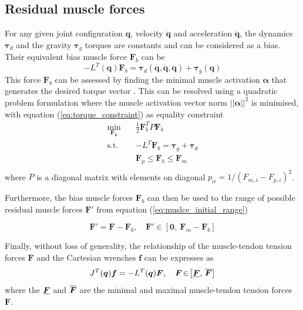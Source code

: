 \subsection{Residual muscle forces}
For any given joint configuration $\bm{q}$, velocity $\dot{\bm{q}}$ and acceleration $\ddot{\bm{q}}$, the dynamics $\bm{\tau}_d$ and the gravity $\bm{\tau}_g$ torques are constants and can be considered as a bias. Their equivalent bias muscle force $\bm{F}_{b}$ can be 
\begin{equation}
    -L^{T}(\bm{q})\bm{F}_{b} = \bm{\tau}_d(\bm{q},\dot{\bm{q}},\ddot{\bm{q}}) + \bm{\tau}_g(\bm{q})
    \label{eq:torque_constraint}
\end{equation}
This force $\bm{F}_{b}$ can be assessed by finding the minimal muscle activation $\bm{\alpha}$ that generates the desired torque vector \cite{ANDERSON2001153}. This can be resolved using a quadratic problem formulation where the muscle activation vector norm $||\bm{\alpha}||^2$ is minimised, with equation (\ref{eq:torque_constraint}) as equality constraint 
\begin{equation}
\begin{aligned}
    \min_{\bm{F_b}} \quad &  \frac{1}{2}\bm{F}_{b}^TP\bm{F}_{b}\\
     \textrm{s.t.} \quad &  -L^T\bm{F}_{b}= \bm{\tau}_g + \bm{\tau}_d \\
          & \bm{F}_{p} \leq \bm{F}_{b} \leq \bm{F}_{m} \\
\end{aligned}
\end{equation}
where  $P$ is a diagonal matrix with elements on diagonal $ p_{ii}=1/(F_{m,i}\! -\! F_{p,i})^2 $. 

Furthermore, the bias muscle forces $\bm{F}_{b}$ can then be used to  the range of possible residual muscle forces $\bm{F}'$ from equation (\ref{eq:muslce_initial_range})

\begin{equation}
    \bm{F}' =  \bm{F} - \bm{F}_{b}, \quad \bm{F}' \in \left[\bm{0}, ~ \bm{F}_{m}\! -\! \bm{F}_{b} \right] 
\end{equation}

Finally, without loss of generality, the relationship of the muscle-tendon tension forces $\bm{F}$ and the Cartesian wrenches $\bm{f}$ can be expresses as
\begin{equation}
    J^{T}(\bm{q})\bm{f} = -L^{T}(\bm{q})\bm{F}, \quad \bm{F} \!\in\! \left[\underline{{\bm{F}}},\,\overline{{\bm{F}}}\right]
\end{equation}
where the $\underline{{\bm{F}}}$ and $\overline{{\bm{F}}}$ are the minimal and maximal muscle-tendon tension forces $\bm{F}$.

